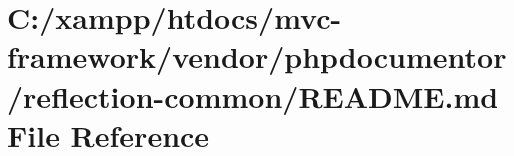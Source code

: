 \hypertarget{vendor_2phpdocumentor_2reflection-common_2_r_e_a_d_m_e_8md}{}\section{C\+:/xampp/htdocs/mvc-\/framework/vendor/phpdocumentor/reflection-\/common/\+R\+E\+A\+D\+ME.md File Reference}
\label{vendor_2phpdocumentor_2reflection-common_2_r_e_a_d_m_e_8md}
